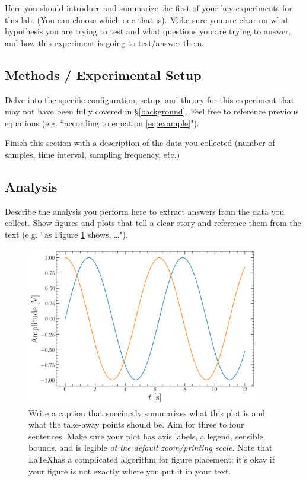 \documentclass[12pt,preprint]{aastex}
\begin{document}
Here you should introduce and summarize the first of your key
experiments for this lab. (You can choose which one that is).
Make sure you are clear on what hypothesis you are trying to test
and what questions you are trying to answer, and how this experiment
is going to test/answer them.

\subsection{Methods / Experimental Setup}

Delve into the specific configuration, setup, and theory for this
experiment that may not have been fully covered in \S\ref{background}.
Feel free to reference previous equations (e.g. ``according to
equation \ref{eq:example}").

Finish this section with a description of the data you collected
(number of samples, time interval, sampling frequency, etc.)

\subsection{Analysis}

Describe the analysis you perform here to extract answers from the
data you collect. Show figures and plots that tell a clear story
and reference them from the text (e.g. ``as Figure \ref{fig:example}
shows, \dots").

\begin{figure}[ht!]
\centering
\includegraphics[width=4in]{example.png}
\caption{Write a caption that succinctly summarizes what this plot
is and what the take-away points should be. Aim for three to four
sentences. Make sure your plot has axis labels, a legend, sensible
bounds, and is legible {\it at the default zoom/printing scale}. Note
that \LaTeX has a complicated algorithm for figure placement; it's
okay if your figure is not exactly where you put it in your
text.}
\label{fig:example}
\end{figure}
\end{document}
